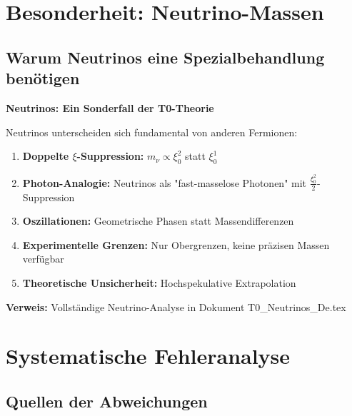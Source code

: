 \documentclass[12pt,a4paper]{article}
\begin{document}
	\section{Besonderheit: Neutrino-Massen}
	
	\subsection{Warum Neutrinos eine Spezialbehandlung benötigen}
	
	\begin{warning}
		\textbf{Neutrinos: Ein Sonderfall der T0-Theorie}
		
		Neutrinos unterscheiden sich fundamental von anderen Fermionen:
		
		\begin{enumerate}
			\item \textbf{Doppelte $\xi$-Suppression:} $m_\nu \propto \xi_0^2$ statt $\xi_0^1$
			
			\item \textbf{Photon-Analogie:} Neutrinos als "fast-masselose Photonen" mit $\frac{\xi_0^2}{2}$-Suppression
			
			\item \textbf{Oszillationen:} Geometrische Phasen statt Massendifferenzen
			
			\item \textbf{Experimentelle Grenzen:} Nur Obergrenzen, keine präzisen Massen verfügbar
			
			\item \textbf{Theoretische Unsicherheit:} Hochspekulative Extrapolation
		\end{enumerate}
		
		\textbf{Verweis:} Vollständige Neutrino-Analyse in Dokument T0\_Neutrinos\_De.tex
	\end{warning}
	
	\section{Systematische Fehleranalyse}
	
	\subsection{Quellen der Abweichungen}
	
\end{document}
